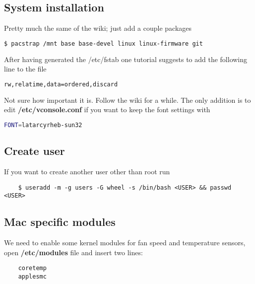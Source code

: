 \documentclass[12pt]{article}
\begin{document}
\subsection*{System installation}
Pretty much the same of the wiki; just add a couple packages
\begin{lstlisting}[language=bash]
    $ pacstrap /mnt base base-devel linux linux-firmware git
\end{lstlisting}
After having generated the /etc/fstab one tutorial suggests to add the following line to the file
\begin{lstlisting}[language=bash]
    rw,relatime,data=ordered,discard
\end{lstlisting}
Not sure how important it is. Follow the wiki for a while. The only addition is to edit \textbf{/etc/vconsole.conf} if you want to keep the font settings with
\begin{lstlisting}[language=bash]
    FONT=latarcyrheb-sun32
\end{lstlisting}

\subsection*{Create user}
If you want to create another user other than root run
\begin{lstlisting}
    $ useradd -m -g users -G wheel -s /bin/bash <USER> && passwd <USER>
\end{lstlisting}

\subsection*{Mac specific modules}
We need to enable some kernel modules for fan speed and temperature sensors, open \textbf{/etc/modules} file and insert two lines:
\begin{lstlisting}
    coretemp
    applesmc
\end{lstlisting}
\end{document}
